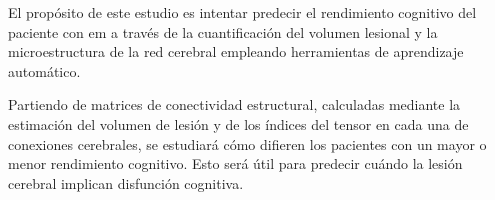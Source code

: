 El propósito de este estudio es intentar predecir el rendimiento cognitivo del paciente con \gls{em} a través de la cuantificación del volumen lesional y la microestructura de la red cerebral empleando herramientas de aprendizaje automático. 

Partiendo de matrices de conectividad estructural, calculadas mediante la estimación del volumen de lesión y de los índices del tensor en cada una de conexiones cerebrales, se estudiará cómo difieren los pacientes con un mayor o menor rendimiento cognitivo. Esto será útil para predecir cuándo la lesión cerebral implican disfunción cognitiva.